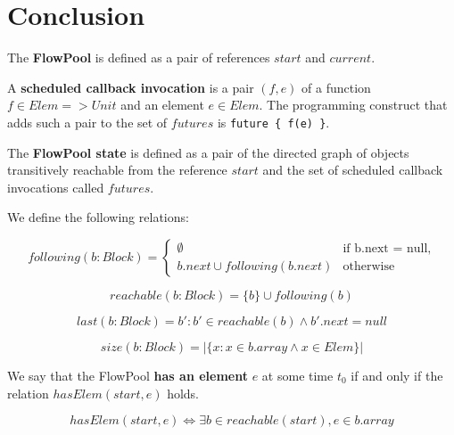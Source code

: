 \documentclass[runningheads,a4paper]{llncs}
\begin{document}
\section{Conclusion}





\setcounter{lemma}{0}
\setcounter{theorem}{0}
\setcounter{corollary}{0}
\setcounter{definition}{0}


\begin{definition}[FlowPool]
The \textbf{FlowPool} is defined as a pair of references $start$ and
$current$.

A \textbf{scheduled callback invocation} is a pair $(f, e)$ of a function
$f \in Elem => Unit$ and an element $e \in Elem$.
The programming construct that adds such a pair to the set of
$futures$ is \verb=future { f(e) }=.

The \textbf{FlowPool state} is defined as a pair of the directed graph of
objects transitively reachable from the reference $start$ and the set
of scheduled callback invocations called $futures$.

We define the following relations:

\begin{equation*}
following(b: Block) = 
\begin{cases}
\emptyset & \text{if b.next = null,}
\\
b.next \cup following(b.next) & \text{otherwise}
\end{cases}
\end{equation*}

\begin{equation*}
reachable(b: Block) = \{ b \} \cup following(b)
\end{equation*}

\begin{equation*}
last(b: Block) = b' : b' \in reachable(b) \wedge b'.next = null
\end{equation*}

\begin{equation*}
size(b: Block) = | \{ x : x \in b.array \wedge x \in Elem \} |
\end{equation*}

We say that the FlowPool \textbf{has an element} $e$ at some time
$t_0$ if and only if the relation $hasElem(start, e)$ holds.

\begin{equation*}
hasElem(start, e) \Leftrightarrow \exists b \in reachable(start), e
\in b.array
\end{equation*}


\end{definition}
\end{document}
